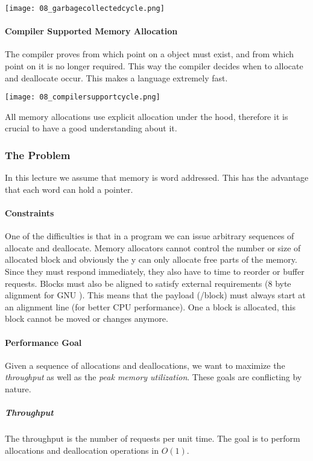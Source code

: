 \texttt{[image: 08\_garbagecollectedcycle.png]}

\paragraph{Compiler Supported Memory Allocation}
The compiler proves from which point on a object must exist, and from which point on it is no longer required. This way the compiler decides when to allocate and deallocate occur. This makes a language extremely fast.

\texttt{[image: 08\_compilersupportcycle.png]}

All memory allocations use explicit allocation under the hood, therefore it is crucial to have a good understanding about it.

\subsubsection{The Problem}
In this lecture we assume that memory is word addressed. This has the advantage that each word can hold a pointer.

\paragraph{Constraints}
One of the difficulties is that in a program we can issue arbitrary sequences of allocate and deallocate. Memory allocators cannot control the number or size of allocated block and obviously the y can only allocate free parts of the memory. Since they must respond immediately, they also have to time to reorder or buffer requests. Blocks must also be aligned to satisfy external requirements (8 byte alignment for GNU ). This means that the payload (/block) must always start at an alignment line (for better CPU performance). One a block is allocated, this block cannot be moved or changes anymore.

\paragraph{Performance Goal}
Given a sequence of allocations and deallocations, we want to maximize the \textit{throughput} as well as the \textit{peak memory utilization}. These goals are conflicting by nature.

\subparagraph{Throughput}
The throughput is the number of requests per unit time. The goal is to perform allocations and deallocation operations in $O(1)$.

